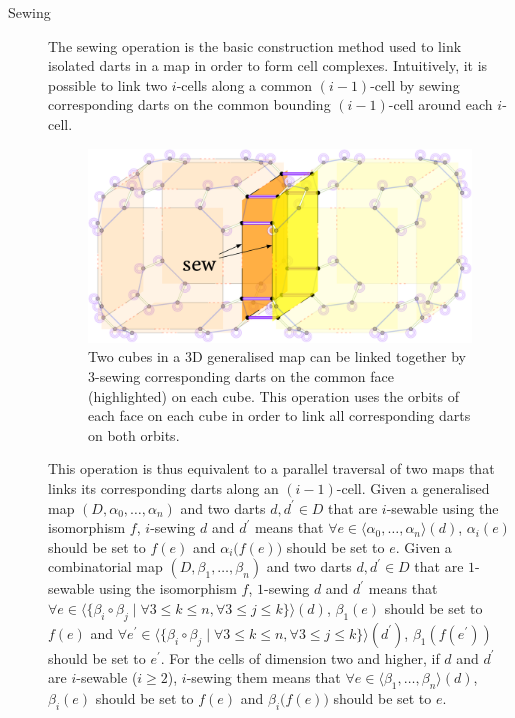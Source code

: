 \begin{description}
\item[Sewing]
The sewing operation is the basic construction method used to link isolated darts in a map in order to form cell complexes.
Intuitively, it is possible to link two $i$-cells along a common $(i-1)$-cell by sewing corresponding darts on the common bounding $(i-1)$-cell around each $i$-cell.
\begin{figure}[tbp]
\centering
\includegraphics[width=\linewidth]{figs/3-sew}
\caption[3-sewing two cubes]{Two cubes in a 3D generalised map can be linked together by 3-sewing corresponding darts on the common face (highlighted) on each cube.
This operation uses the orbits of each face on each cube in order to link all corresponding darts on both orbits.}
\end{figure}
This operation is thus equivalent to a parallel traversal of two maps that links its corresponding darts along an $(i-1)$-cell.
Given a generalised map $(D,\alpha_{0},\ldots,\alpha_{n})$ and two darts $d,d^\prime \in D$ that are $i$-sewable using the isomorphism $f$, $i$-sewing $d$ and $d^\prime$ means that $\forall e \in \langle\alpha_0, \ldots, \alpha_n\rangle(d)$, $\alpha_i(e)$ should be set to $f(e)$ and $\alpha_i\big(f(e)\big)$ should be set to $e$.
Given a combinatorial map $(D, \beta_{1}, \ldots, \beta_{n})$ and two darts $d,d^\prime \in D$ that are $1$-sewable using the isomorphism $f$, $1$-sewing $d$ and $d^\prime$ means that $\forall e \in \langle \{\beta_i\circ \beta_j \mid \forall 3 \leq k \leq n, \forall 3 \leq j \leq k\} \rangle(d)$, $\beta_1(e)$ should be set to $f(e)$ and $\forall e^\prime \in \langle \{\beta_i\circ \beta_j \mid \forall 3 \leq k \leq n, \forall 3 \leq j \leq k\} \rangle(d^\prime)$, $\beta_1(f(e^\prime))$ should be set to $e^\prime$.
For the cells of dimension two and higher, if $d$ and $d^\prime$ are $i$-sewable ($i \geq 2$), $i$-sewing them means that $\forall e \in \langle\beta_{1}, \ldots, \beta_{n}\rangle(d)$, $\beta_i(e)$ should be set to $f(e)$ and $\beta_i\big(f(e)\big)$ should be set to $e$.

\end{description}

